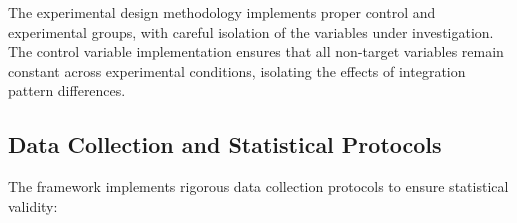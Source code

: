     

The experimental design methodology implements proper control and experimental groups, with careful isolation of the variables under investigation. The control variable implementation ensures that all non-target variables remain constant across experimental conditions, isolating the effects of integration pattern differences.

\subsection{Data Collection and Statistical Protocols}

The framework implements rigorous data collection protocols to ensure statistical validity:

    
        
        
        
